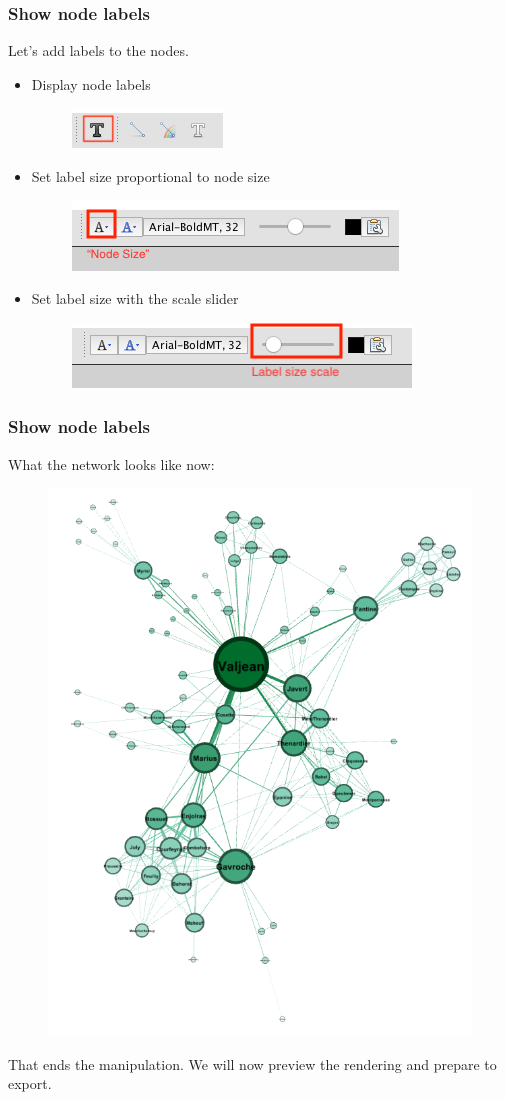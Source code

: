 \documentclass[10pt]{beamer}
\begin{document}
\begin{frame}
\frametitle{Show node labels}
Let's add labels to the nodes.

\begin{itemize}
	\item Display node labels
	\begin{figure}
		\includegraphics[width=0.4\linewidth]{figures/show_labels.png}
	\end{figure}
	\item Set label size proportional to node size
	\begin{figure}
		\includegraphics[width=0.4\linewidth]{figures/node_size_label_mode.png}
	\end{figure}
	\item Set label size with the scale slider
	\begin{figure}
		\includegraphics[width=0.4\linewidth]{figures/label_size_scale.png}
	\end{figure}
\end{itemize}
\end{frame}

\begin{frame}
\frametitle{Show node labels}
What the network looks like now:

\begin{figure}
	\includegraphics[width=0.4\linewidth]{figures/network_with_labels.png}
\end{figure}

That ends the manipulation. We will now preview the rendering and prepare to export.
\end{frame}
\end{document}
